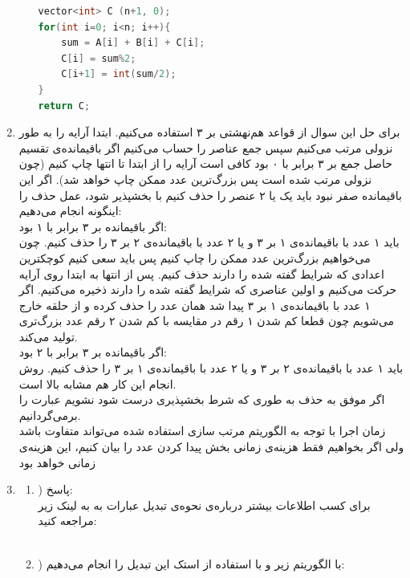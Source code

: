 \documentclass{article}
\begin{document}
\begin{enumerate}
\begin{enumerate}
\begin{latin}
\begin{flushright}
\begin{lstlisting}[language=C++]
vector<int> C (n+1, 0);
for(int i=0; i<n; i++){
	sum = A[i] + B[i] + C[i]; 
	C[i] = sum%2; 
	C[i+1] = int(sum/2);
}
return C;
\end{lstlisting}
\end{flushright}								
\end{latin}
	\end{enumerate}
	\item برای حل این سوال از قواعد هم‌نهشتی بر ۳ استفاده می‌کنیم. ابتدا آرایه را به طور نزولی مرتب می‌کنیم سپس جمع عناصر را حساب می‌کنیم اگر باقیمانده‌ی تقسیم حاصل جمع بر ۳ برابر با ۰ بود کافی است آرایه را از ابتدا تا انتها چاپ کنیم (چون نزولی مرتب شده است پس بزرگ‌ترین عدد ممکن چاپ خواهد شد). اگر این باقیمانده صفر نبود باید یک یا ۲ عنصر را حذف کنیم با بخشپذیر شود، عمل حذف را اینگونه انجام می‌دهیم:\\
	\lr{-} اگر باقیمانده بر ۳ برابر با ۱ بود:\\
	باید ۱ عدد با باقیمانده‌ی ۱ بر ۳ و یا ۲ عدد با باقیمانده‌ی ۲ بر ۳ را حذف کنیم. چون می‌خواهیم بزرگ‌ترین عدد ممکن را چاپ کنیم پس باید سعی کنیم کوچکترین اعدادی که شرایط گفته شده را دارند حذف کنیم. پس از انتها به ابتدا روی آرایه حرکت می‌کنیم و  اولین عناصری که شرایط گفته شده را دارند ذخیره می‌کنیم. اگر ۱ عدد با باقیمانده‌ی ۱ بر ۳ پیدا شد همان عدد را حذف کرده و از حلقه خارج می‌شویم چون قطعا کم شدن ۱ رقم در مقایسه با کم شدن ۲ رقم عدد بزرگ‌تری تولید می‌کند. \\
	\lr{-} اگر باقیمانده بر ۳ برابر با ۲ بود:\\
	باید ۱ عدد با باقیمانده‌ی ۲ بر ۳ و یا ۲ عدد با باقیمانده‌ی ۱ بر ۳ را حذف کنیم. روش انجام این کار هم مشابه بالا است.\\
	اگر موفق به حذف به طوری که شرط بخشپذیری درست شود نشویم عبارت  را برمی‌گردانیم.\\
	زمان اجرا با توجه به الگوریتم مرتب سازی استفاده شده می‌تواند متفاوت باشد ولی اگر بخواهیم فقط هزینه‌ی زمانی بخش پیدا کردن عدد را بیان کنیم، این هزینه‌ی زمانی  خواهد بود
	\item 
	\begin{enumerate}
		\item) پاسخ:  \\
		برای کسب اطلاعات بیشتر درباره‌ی نحوه‌ی تبدیل عبارات  به  به لینک زیر مراجعه کنید: \\
		\\
		\item) با الگوریتم زیر و با استفاده از استک این تبدیل را انجام می‌دهیم:\\

\end{enumerate}
\end{enumerate}
\end{document}
